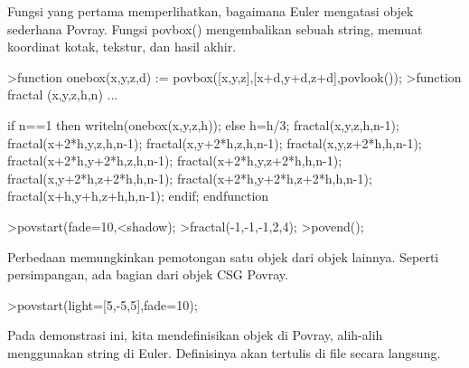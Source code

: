 \documentclass{article}
\begin{document}
\begin{eulernotebook}
\begin{eulercomment}
Fungsi yang pertama memperlihatkan, bagaimana Euler mengatasi objek
sederhana Povray. Fungsi povbox() mengembalikan sebuah string, memuat
koordinat kotak, tekstur, dan hasil akhir.
\end{eulercomment}
\begin{eulerprompt}
>function onebox(x,y,z,d) := povbox([x,y,z],[x+d,y+d,z+d],povlook());
>function fractal (x,y,z,h,n) ...
\end{eulerprompt}
\begin{eulerudf}
   if n==1 then writeln(onebox(x,y,z,h));
   else
     h=h/3;
     fractal(x,y,z,h,n-1);
     fractal(x+2*h,y,z,h,n-1);
     fractal(x,y+2*h,z,h,n-1);
     fractal(x,y,z+2*h,h,n-1);
     fractal(x+2*h,y+2*h,z,h,n-1);
     fractal(x+2*h,y,z+2*h,h,n-1);
     fractal(x,y+2*h,z+2*h,h,n-1);
     fractal(x+2*h,y+2*h,z+2*h,h,n-1);
     fractal(x+h,y+h,z+h,h,n-1);
   endif;
  endfunction
\end{eulerudf}
\begin{eulerprompt}
>povstart(fade=10,<shadow);
>fractal(-1,-1,-1,2,4);
>povend();
\end{eulerprompt}
\begin{eulercomment}
Perbedaan memungkinkan pemotongan satu objek dari objek lainnya.
Seperti persimpangan, ada bagian dari objek CSG Povray.
\end{eulercomment}
\begin{eulerprompt}
>povstart(light=[5,-5,5],fade=10);
\end{eulerprompt}
\begin{eulercomment}
Pada demonstrasi ini, kita mendefinisikan objek di Povray, alih-alih
menggunakan string di Euler. Definisinya akan tertulis di file secara
langsung.


\end{eulercomment}
\end{eulernotebook}
\end{document}
